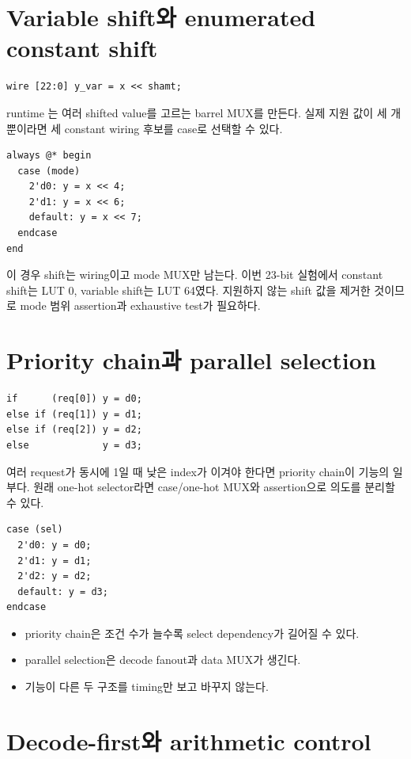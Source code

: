 \section{Variable shift와 enumerated constant shift}

\begin{lstlisting}
wire [22:0] y_var = x << shamt;
\end{lstlisting}

runtime 는 여러 shifted value를 고르는 barrel MUX를 만든다. 실제
지원 값이 세 개뿐이라면 세 constant wiring 후보를 case로 선택할 수 있다.

\begin{lstlisting}
always @* begin
  case (mode)
    2'd0: y = x << 4;
    2'd1: y = x << 6;
    default: y = x << 7;
  endcase
end
\end{lstlisting}

이 경우 shift는 wiring이고 mode MUX만 남는다. 이번 23-bit 실험에서 constant
shift는 LUT 0, variable shift는 LUT 64였다. 지원하지 않는 shift 값을 제거한
것이므로 mode 범위 assertion과 exhaustive test가 필요하다.

\section{Priority chain과 parallel selection}

\begin{lstlisting}
if      (req[0]) y = d0;
else if (req[1]) y = d1;
else if (req[2]) y = d2;
else             y = d3;
\end{lstlisting}

여러 request가 동시에 1일 때 낮은 index가 이겨야 한다면 priority chain이 기능의
일부다. 원래 one-hot selector라면 case/one-hot MUX와 assertion으로 의도를 분리할
수 있다.

\begin{lstlisting}
case (sel)
  2'd0: y = d0;
  2'd1: y = d1;
  2'd2: y = d2;
  default: y = d3;
endcase
\end{lstlisting}

\begin{itemize}
  \item priority chain은 조건 수가 늘수록 select dependency가 길어질 수 있다.
  \item parallel selection은 decode fanout과 data MUX가 생긴다.
  \item 기능이 다른 두 구조를 timing만 보고 바꾸지 않는다.
\end{itemize}

\section{Decode-first와 arithmetic control}

